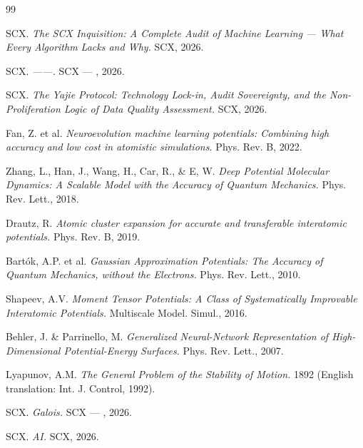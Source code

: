 \documentclass[12pt,a4paper]{article}
\theoremstyle{remark}
\begin{document}
% 
\begin{thebibliography}{99}

SCX. \textit{The SCX Inquisition: A Complete Audit of Machine Learning — What Every Algorithm Lacks and Why.}
SCX, 2026.

SCX. \textit{——.}
SCX — , 2026.

SCX. \textit{The Yajie Protocol: Technology Lock-in, Audit Sovereignty, and the Non-Proliferation Logic of Data Quality Assessment.}
SCX, 2026.

Fan, Z. et al. \textit{Neuroevolution machine learning potentials: Combining high accuracy and low cost in atomistic simulations.}
Phys. Rev. B, 2022.

Zhang, L., Han, J., Wang, H., Car, R., \& E, W. \textit{Deep Potential Molecular Dynamics: A Scalable Model with the Accuracy of Quantum Mechanics.}
Phys. Rev. Lett., 2018.

Drautz, R. \textit{Atomic cluster expansion for accurate and transferable interatomic potentials.}
Phys. Rev. B, 2019.

Bart\'{o}k, A.P. et al. \textit{Gaussian Approximation Potentials: The Accuracy of Quantum Mechanics, without the Electrons.}
Phys. Rev. Lett., 2010.

Shapeev, A.V. \textit{Moment Tensor Potentials: A Class of Systematically Improvable Interatomic Potentials.}
Multiscale Model. Simul., 2016.

Behler, J. \& Parrinello, M. \textit{Generalized Neural-Network Representation of High-Dimensional Potential-Energy Surfaces.}
Phys. Rev. Lett., 2007.

Lyapunov, A.M. \textit{The General Problem of the Stability of Motion.}
1892 (English translation: Int. J. Control, 1992).

SCX. \textit{Galois.}
SCX — , 2026.

SCX. \textit{AI.}
SCX, 2026.

\end{thebibliography}
\end{document}
